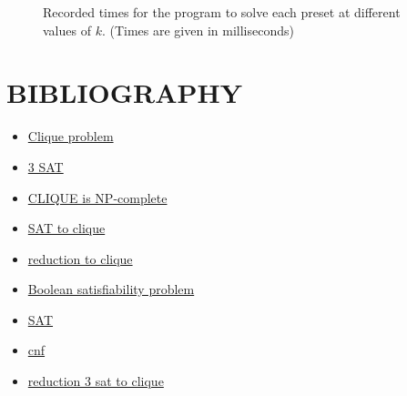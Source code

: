 \documentclass[table]{article}
\begin{document}
\begin{figure}[h]
\begin{subfigure}{0.49\linewidth}
    \end{subfigure}
    \caption{Recorded times for the program to solve each preset at different values of $k$. (Times are given in milliseconds)}
\end{figure}

\newpage\section{BIBLIOGRAPHY}
\begin{itemize}
\item\href{https://en.wikipedia.org/wiki/Clique_problem}{Clique problem}    
\item\href{http://www.cs.ecu.edu/karl/6420/spr16/Notes/NPcomplete/3sat.html}{3 SAT}    
\item\href{https://www.geeksforgeeks.org/proof-that-clique-decision-problem-is-np-complete}{CLIQUE is NP-complete}    
\item\href{https://opendsa-server.cs.vt.edu/ODSA/Books/Everything/html/threeSAT_to_clique.html}{SAT to clique}    
\item\href{https://paperzz.com/doc/7301675/3sat-reduction-to-clique}{reduction to clique} 
\item\href{https://en.wikipedia.org/wiki/Boolean_satisfiability_problem}{Boolean satisfiability problem}
\item\href{https://www.cs.umd.edu/~gasarch/TOPICS/sat/SATtalk.pdf}{SAT}
\item\href{https://logic4free.informatik.uni-kiel.de/llocs/Conjunctive_normal_form_(propositional_logic)}{cnf}
\item\href{https://cs.stackexchange.com/questions/70531/reduction-3sat-and-clique}{reduction 3 sat to clique}
\end{itemize}
\end{document}
